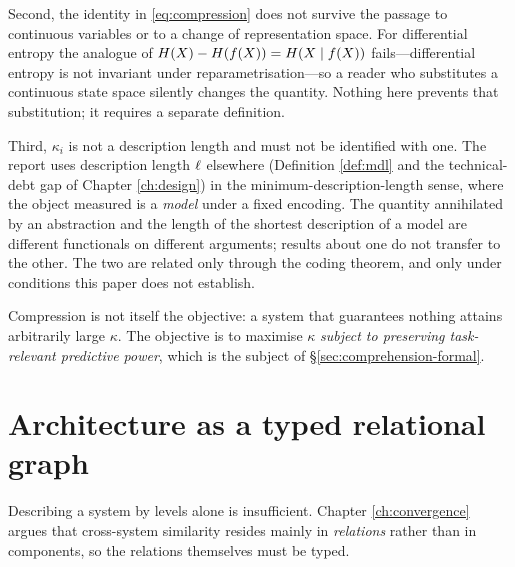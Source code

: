 Second, the identity in \eqref{eq:compression} does not survive the passage to continuous variables
or to a change of representation space. For differential entropy the analogue of
$H(X)-H(f(X)) = H(X \mid f(X))$ fails---differential entropy is not invariant
under reparametrisation---so a reader who substitutes a continuous state space silently changes the
quantity. Nothing here prevents that substitution; it requires a separate definition.

Third, $\kappa_i$ is not a description length and must not be identified with one. The report uses
description length $\ell$ elsewhere (Definition \ref{def:mdl} and the technical-debt gap of
Chapter \ref{ch:design}) in the minimum-description-length sense, where the object measured is a
\emph{model} under a fixed encoding. The quantity annihilated by an abstraction and the length of the
shortest description of a model are different functionals on different arguments; results about one
do not transfer to the other. The two are related only through the coding theorem, and only under
conditions this paper does not establish.

Compression is not itself the objective: a system that guarantees nothing attains
arbitrarily large $\kappa$. The objective is to maximise $\kappa$ \emph{subject to
preserving task-relevant predictive power}, which is the subject of
\S\ref{sec:comprehension-formal}.

\section{Architecture as a typed relational graph}\label{sec:relations}

Describing a system by levels alone is insufficient. Chapter \ref{ch:convergence} argues
that cross-system similarity resides mainly in \emph{relations} rather than in components,
so the relations themselves must be typed.

